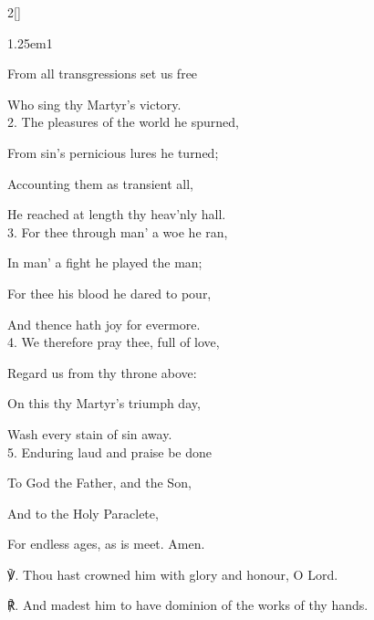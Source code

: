 \begin{paracol}{2}[]
\sloppy

\firstEvensong


\firstEvensongHymn\label{MartyrEvensong}



\begin{hangparas}{1.25em}{1}

From all transgressions set us free

Who sing thy Martyr's victory.\\

2. The pleasures of the world he spurned,

From sin's pernicious lures he turned;

Accounting them as transient all,

He reached at length thy heav'nly hall.\\

3. For thee through man' a woe he ran,

In man' a fight he played the man;

For thee his blood he dared to pour,

And thence hath joy for evermore.\\

4. We therefore pray thee, full of love,

Regard us from thy throne above:

On this thy Martyr's triumph day,

Wash every stain of sin away.\\

5. Enduring laud and praise be done

To God the Father, and the Son,

And to the Holy Paraclete,

For endless ages, as is meet. Amen.\\
\end{hangparas}

℣. Thou hast crowned him with glory and honour, O Lord. 

℟. And madest him to have dominion of the works of thy hands.



\end{paracol}

